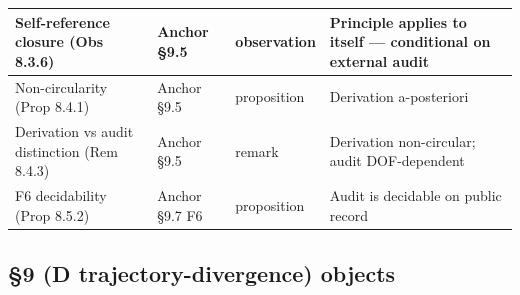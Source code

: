 \documentclass[11pt, openany]{book}
\begin{document}
\begin{longtable}{p{0.97in} p{0.75in} p{0.57in} p{1.99in}}
\midrule
Self-reference closure (Obs 8.3.6) & Anchor §9.5 & observation & Principle applies to itself --- conditional on external audit \\
\midrule
Non-circularity (Prop 8.4.1) & Anchor §9.5 & proposition & Derivation a-posteriori \\
\midrule
Derivation vs audit distinction (Rem 8.4.3) & Anchor §9.5 & remark & Derivation non-circular; audit DOF-dependent \\
\midrule
F6 decidability (Prop 8.5.2) & Anchor §9.7 F6 & proposition & Audit is decidable on public record \\
\bottomrule
\end{longtable}
\endgroup
\subsection{§9 (D trajectory-divergence) objects}
\end{document}

